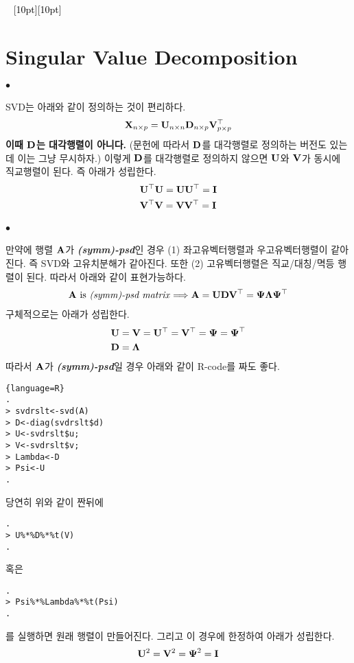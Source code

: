 \documentclass[12pt,oneside,english,a4paper]{article}
\newcommand{\dash}{\noindent \newline\textcolor{black}{\hrulefill~ \raisebox{-2.5pt}[10pt][10pt]{\leafright \decofourleft \decothreeleft  \aldineright \decotwo \floweroneleft \decoone   \floweroneright \decotwo \aldineleft\decothreeright \decofourright \leafleft} ~  \hrulefill}}
\def\ck{\paragraph{\Large$\bullet$}\Large}
\newcommand{\bfA}{\mbox{$\bf{A}$}}
\newcommand{\bfU}{\mbox{$\bf{U}$}}
\newcommand{\bfV}{\mbox{$\bf{V}$}}
\begin{document}
\dash 

\section{Singular Value Decomposition}
 
\ck SVD는 아래와 같이 정의하는 것이 편리하다. 
\begin{align*}
{\bf X}_ {n\times p}={\bf U}_ {n\times n} {\bf D}_ {n \times p} {\bf V}_ {p\times p}^\top
\end{align*}
\textbf{이때 ${\bf D}$는 대각행렬이 아니다.} (문헌에 따라서 $\bf D$를 대각행렬로 정의하는 버전도 있는데 이는 그냥 무시하자.) 이렇게 ${\bf D}$를 대각행렬로 정의하지 않으면 $\bfU$와 $\bfV$가 동시에 직교행렬이 된다. 즉 아래가 성립한다. 
\begin{align*}
& \bf U^\top U=UU^\top=I\\ 
& \bf V^\top V=VV^\top=I
\end{align*}

\ck 만약에 행렬 ${\bf A}$가 \textbf{\emph{(symm)-psd}}인 경우 (1) 좌고유벡터행렬과 우고유벡터행렬이 같아진다. 즉 SVD와 고유치분해가 같아진다. 또한 (2) 고유벡터행렬은 직교/대칭/멱등 행렬이 된다. 따라서 아래와 같이 표현가능하다. 
\begin{align*}
\bfA \mbox { is \emph{(symm)-psd matrix}} \Longrightarrow \bf A= UDV^\top=\Psi \Lambda \Psi^\top
\end{align*}
구체적으로는 아래가 성립한다. 
\begin{align*}
& {\bf U}={\bf V}={\bf U}^\top={\bf V}^\top={\boldsymbol \Psi}={\boldsymbol \Psi}^\top \\
& {\bf D}={\boldsymbol \Lambda}
\end{align*}
따라서 ${\bf A}$가 \textbf{\emph{(symm)-psd}}일 경우 아래와 같이 R-code를 짜도 좋다. 
\begin{lstlisting}{language=R}
.
> svdrslt<-svd(A)
> D<-diag(svdrslt$d)
> U<-svdrslt$u; 
> V<-svdrslt$v; 
> Lambda<-D
> Psi<-U
.
\end{lstlisting}
당연히 위와 같이 짠뒤에 
\begin{lstlisting}
.
> U%*%D%*%t(V)
.
\end{lstlisting}
혹은 
\begin{lstlisting}
.
> Psi%*%Lambda%*%t(Psi)
.
\end{lstlisting}
를 실행하면 원래 행렬이 만들어진다. 그리고 이 경우에 한정하여 아래가 성립한다. 
\begin{align*}
{\bf U}^2={\bf V}^2={\boldsymbol \Psi}^2={\bf I}
\end{align*}
\end{document}
